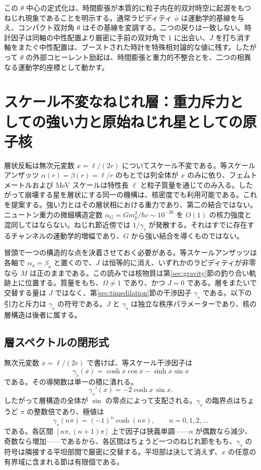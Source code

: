 \documentclass[a4paper]{article}
\begin{document}
この $\theta$ 中心の定式化は、時間膨張が本質的に粒子内在的双対時空に起源をもつねじれ現象であることを明示する。通常ラピディティ $\phi$ は運動学的基線を与え、コンパクト双対角 $\theta$ はその基線を変調する。二つの戻りは一致しない。時計因子は同軸の中性配置より厳密に手前の双対角で $1$ に出会い、$J$ を打ち消す軸をまたぐ中性配置は、ブーストされた時計を特殊相対論的な値に残す。したがって $\theta$ の外部コヒーレント励起は、時間膨張と重力的不整合とを、二つの相異なる運動学的座標として動かす。

\section{スケール不変なねじれ層：重力斥力としての強い力と原始ねじれ星としての原子核}
\label{sec:nuclear}

層状反転は無次元変数 \(x=\ell/(2r)\) についてスケール不変である。等スケールアンザッツ \(\alpha(r)=\beta(r)=\ell/r\) のもとでは列全体が \(x\) のみに依り、フェムトメートルおよび MeV スケールは特性長 \(\ell\) と粒子質量を通じてのみ入る。したがって崩壊する星を層状にする同一の機構は、核密度でも利用可能である。これを提案する。強い力とはその層状相における重力であり、第二の結合ではない。ニュートン重力の微細構造定数 \(\alpha_G=G m_p^2/\hbar c\sim 10^{-38}\) を \(O(1)\) の核力強度と混同してはならない。ねじれ節近傍では \(1/\gamma_s\) が発散する。それはすでに存在するチャンネルの運動学的増幅であり、\(G\) から強い結合を導くものではない。

冒頭で一つの構造的な点を決着させておく必要がある。等スケールアンザッツは各軸で \(\alpha_a=\beta_a\) と置くので、\(J\) は恒等的に消え、いずれかのラピディティが非零なら \(M\) は正のままである。この読みでは核物質は第\ref{sec:gravity}節の釣り合い軌跡上に位置する。質量をもち、\(\Omega\neq 1\) であり、かつ \(J=0\) である。層をまたいで交替する量は \(J\) ではなく、第\ref{sec:timedilation}節の干渉因子 \(\gamma_s\) である。以下の引力と斥力は \(\gamma_s\) の符号である。\(J\) と \(\gamma_s\) は独立な秩序パラメーターであり、核の層構造は後者に属する。

\subsection{層スペクトルの閉形式}
\label{subsec:layer-spectrum}

無次元変数 \(x=\ell/(2r)\) で書けば、等スケール干渉因子は
\[
\gamma_s(x)=\cosh x\cos x-\sinh x\sin x
\]
である。その導関数は単一の積に潰れる。
\begin{equation}
\label{eq:gammaS-derivative}
\gamma_s'(x)=-2\cosh x\,\sin x .
\end{equation}
したがって層構造の全体が \(\sin\) の零点によって支配される。\(\gamma_s\) の臨界点はちょうど \(\pi\) の整数倍であり、極値は
\[
\gamma_s(n\pi)=(-1)^n\cosh(n\pi),\qquad n=0,1,2,\dots
\]
である。各区間 \([n\pi,(n+1)\pi]\) 上で因子は狭義単調——\(n\) が偶数なら減少、奇数なら増加——であるから、各区間はちょうど一つのねじれ節をもち、\(\gamma_s\) の符号は隣接する平坦部間で厳密に交替する。平坦部は決して消えず、\(x\) の任意の有界域に含まれる節は有限個である。
\end{document}
